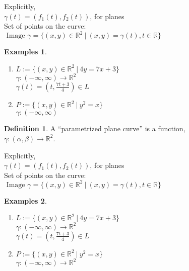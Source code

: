 \documentclass[twocolumn,20pt,fleqn]{extarticle}
\theoremstyle{plain}
\theoremstyle{definition}
\newtheorem*{definition}{Definition}
\newtheorem*{exmpls}{Examples}
\theoremstyle{remark}
\newenvironment*{examples}{\begin{exmpls} ~ \begin{enumerate}}{\end{enumerate}\end{exmpls}}
\begin{document}
Explicitly,\\
$\gamma(t) = (f_1(t), f_2(t))$, for planes\\

Set of points on the curve:\\  $\textrm{ Image } \gamma = \{(x,y) \in \mathbb{R}^2 \ |\ (x,y) = \gamma(t), t \in \mathbb{R}\}$




\begin{examples}
  \item $L:=\{(x,y) \in \mathbb{R}^2\ |\ 4y = 7x + 3\}$\\
  $\gamma  : (-\infty,\infty) \to \mathbb{R}^2$ \\
  $\gamma(t) = (t, \frac{7t+3}{4})  \in L$\\
  \item $P:=\{(x,y) \in \mathbb{R}^2\ |\ y^2 = x\}$\\
  $\gamma  : (-\infty,\infty) $\end{examples}


\clearpage




\begin{definition}
  A  ``parametrized plane curve''  is a  function,\\ $\gamma  : (\alpha, \beta) \to \mathbb{R}^2$.
\end{definition}

Explicitly,\\
$\gamma(t) = (f_1(t), f_2(t))$, for planes\\

Set of points on the curve:\\  $\textrm{ Image } \gamma = \{(x,y) \in \mathbb{R}^2 \ |\ (x,y) = \gamma(t), t \in \mathbb{R}\}$




\begin{examples}
  \item $L:=\{(x,y) \in \mathbb{R}^2\ |\ 4y = 7x + 3\}$\\
  $\gamma  : (-\infty,\infty) \to \mathbb{R}^2$ \\
  $\gamma(t) = (t, \frac{7t+3}{4})  \in L$\\
  \item $P:=\{(x,y) \in \mathbb{R}^2\ |\ y^2 = x\}$\\
  $\gamma  : (-\infty,\infty) \to \mathbb{R}^2$ \end{examples}


\clearpage
\end{document}
